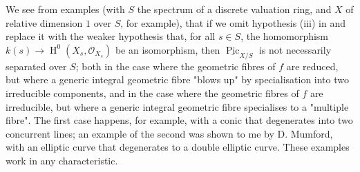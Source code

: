 \begin{remark}\label{fga3.v-3-remark-3.2}
    We see from examples (with $S$ the spectrum of a discrete valuation ring, and $X$ of relative dimension $1$ over $S$, for example), that if we omit hypothesis (iii) in  and replace it with the weaker hypothesis that, for all $s\in S$, the homomorphism $k(s)\to\operatorname{H}^0(X_s,\mathcal{O}_{X_s})$ be an isomorphism, then $\underline{\operatorname{Pic}}_{X/S}$ is not necessarily separated over $S$;
    both in the case where the geometric fibres of $f$ are reduced, but where a generic integral geometric fibre "blows up" by specialisation into two irreducible components, and in the case where the geometric fibres of $f$ are irreducible, but where a generic integral geometric fibre specialises to a "multiple fibre".
    The first case happens, for example, with a conic that degenerates into two concurrent lines; an example of the second was shown to me by D. Mumford, with an elliptic curve that degenerates to a double elliptic curve.
    These examples work in any characteristic.
\end{remark}

